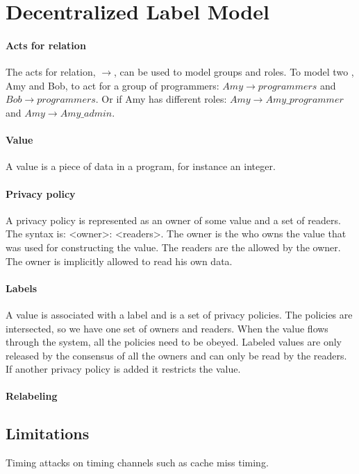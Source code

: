\section{Decentralized Label Model}
\newcommand{\xvalue}{value}
\newcommand{\xvalues}{values}

\paragraph{Acts for relation}
The acts for relation, $\rightarrow$, can be used to model groups and roles.
To model two \principals{}, Amy and Bob, to act for a group of programmers: $Amy \rightarrow programmers$ and $Bob \rightarrow programmers$.
Or if Amy has different roles: $Amy \rightarrow Amy\_programmer$ and $Amy \rightarrow Amy\_admin$.

\paragraph{Value}
A \xvalue{} is a piece of data in a program, for instance an integer.

\paragraph{Privacy policy}
A privacy policy is represented as an owner of some \xvalue{} and a set of readers.
The syntax is: <owner>: <readers>.
The owner is the \principal{} who owns the \xvalue{} that was used for constructing the \xvalue{}.
The readers are the \principals{} allowed by the owner.
The owner is implicitly allowed to read his own data.

\paragraph{Labels}
A \xvalue{} is associated with a label and is a set of privacy policies.
The policies are intersected, so we have one set of owners and readers.
When the \xvalue{} flows through the system, all the policies need to be obeyed.
Labeled \xvalues{} are only released by the consensus of all the owners and can only be read by the readers.
If another privacy policy is added it restricts the \xvalue{}.

\paragraph{Relabeling}


\subsection{Limitations}
Timing attacks on timing channels such as cache miss timing.
